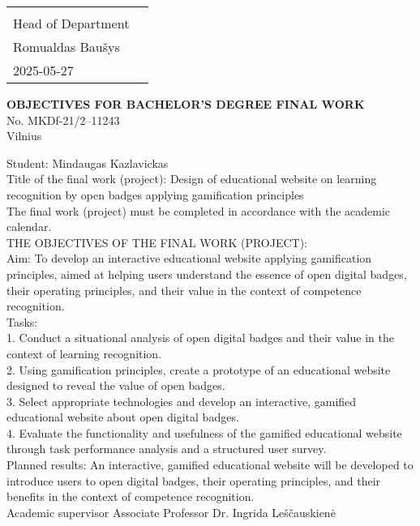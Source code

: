 {\begin{tabularx}{\textwidth}{Xc}
&
\begin{minipage}[t]{0.2\textwidth}
    {APPROVED BY}\\
    {Head of Department}\\
    {Romualdas Baušys}\\
    {2025-05-27}
\end{minipage}
\end{tabularx}
%
\vspace{4pt}
%
\begin{center}
{\textbf {OBJECTIVES FOR BACHELOR'S DEGREE FINAL WORK}}\\[0.5\baselineskip]
{No. MKDf-21/2–11243}\\
{Vilnius}\\
\end{center}
%
\noindent
{Student: Mindaugas Kazlavickas}\\[0.5\baselineskip]
%
\noindent
{ Title of the final work (project): Design of educational website on learning recognition by open badges applying gamification principles}\\[0.5\baselineskip]
%
\noindent
{The final work (project) must be completed in accordance with the academic calendar.}\\[1.0\baselineskip]
\noindent
{THE OBJECTIVES OF THE FINAL WORK (PROJECT):}\\[0.5\baselineskip]
{Aim: To develop an interactive educational website applying gamification principles, aimed at helping users understand the essence of open digital badges, their operating principles, and their value in the context of competence recognition.}\\[1.0\baselineskip]
Tasks:\\[-0.2\baselineskip]
1. Conduct a situational analysis of open digital badges and their value in the context of learning recognition.\\[-0.2\baselineskip]
2. Using gamification principles, create a prototype of an educational website designed to reveal the value of open badges.\\[-0.2\baselineskip]
3. Select appropriate technologies and develop an interactive, gamified educational website about open digital badges.\\[-0.2\baselineskip]
4. Evaluate the functionality and usefulness of the gamified educational website through task performance analysis and a structured user survey.\\[0.5\baselineskip]
\noindent
{Planned results: An interactive, gamified educational website will be developed to introduce users to open digital badges, their operating principles, and their benefits in the context of competence recognition.}\\[1.2\baselineskip]
\noindent
{Academic supervisor Associate Professor Dr. Ingrida Leščauskienė}
}